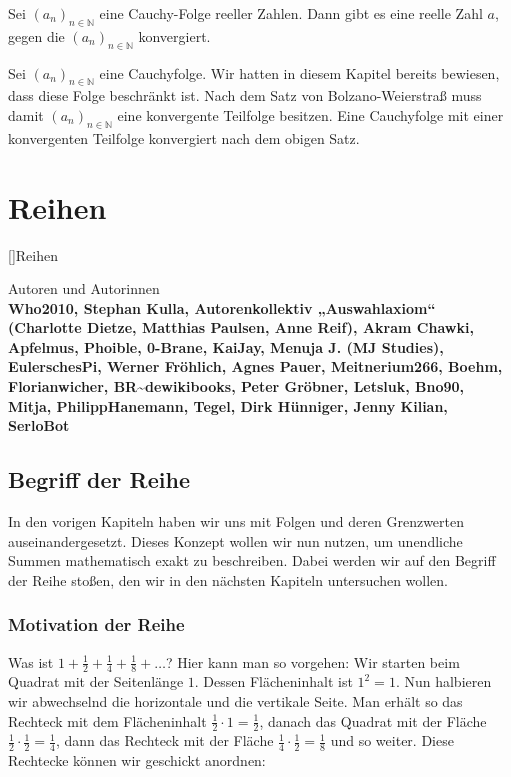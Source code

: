 \documentclass[fontsize=9pt,
               parskip=half-,
               DIV=14,
               listof=chapterentry,
               tocflat]{scrbook}
\newenvironment{authors}{\par\vspace*{\fill}\color{white}Autoren und
Autorinnen\\\bfseries}{\clearpage}
\begin{document}
\begin{theorem*}
Sei $(a_{n})_{n\in \mathbb {N} }$ eine Cauchy-Folge reeller Zahlen. Dann gibt es eine reelle Zahl $a$, gegen die $(a_{n})_{n\in \mathbb {N} }$ konvergiert.

\end{theorem*}

\begin{proof*}
Sei $(a_{n})_{n\in \mathbb {N} }$ eine Cauchyfolge. Wir hatten in diesem Kapitel bereits bewiesen, dass diese Folge beschränkt ist. Nach dem Satz von Bolzano-Weierstraß muss damit $(a_{n})_{n\in \mathbb {N} }$ eine konvergente Teilfolge besitzen. Eine Cauchyfolge mit einer konvergenten Teilfolge konvergiert nach dem obigen Satz.

\end{proof*}

\part{Reihen}

[]{Reihen}\begin{authors}
Who2010, Stephan Kulla, Autorenkollektiv „Auswahlaxiom“ (Charlotte Dietze, Matthias Paulsen, Anne Reif), Akram Chawki, Apfelmus, Phoible, 0-Brane, KaiJay, Menuja J. (MJ Studies), EulerschesPi, Werner Fröhlich, Agnes Pauer, Meitnerium266, Boehm, Florianwicher, BR\textasciitilde{}dewikibooks, Peter Gröbner, Letsluk, Bno90, Mitja, PhilippHanemann, Tegel, Dirk Hünniger, Jenny Kilian, SerloBot\end{authors}

\chapter{Begriff der Reihe}

In den vorigen Kapiteln haben wir uns mit Folgen und deren Grenzwerten auseinandergesetzt. Dieses Konzept wollen wir nun nutzen, um unendliche Summen mathematisch exakt zu beschreiben. Dabei werden wir auf den Begriff der Reihe stoßen, den wir in den nächsten Kapiteln untersuchen wollen.

\section{Motivation der Reihe}

Was ist $1+{\tfrac {1}{2}}+{\tfrac {1}{4}}+{\tfrac {1}{8}}+\ldots $? Hier kann man so vorgehen: Wir starten beim Quadrat mit der Seitenlänge $1$. Dessen Flächeninhalt ist $1^{2}=1$. Nun halbieren wir abwechselnd die horizontale und die vertikale Seite. Man erhält so das Rechteck mit dem Flächeninhalt ${\tfrac {1}{2}}\cdot 1={\tfrac {1}{2}}$, danach das Quadrat mit der Fläche ${\tfrac {1}{2}}\cdot {\tfrac {1}{2}}={\tfrac {1}{4}}$, dann das Rechteck mit der Fläche ${\tfrac {1}{4}}\cdot {\tfrac {1}{2}}={\tfrac {1}{8}}$ und so weiter. Diese Rechtecke können wir geschickt anordnen:
\end{document}
